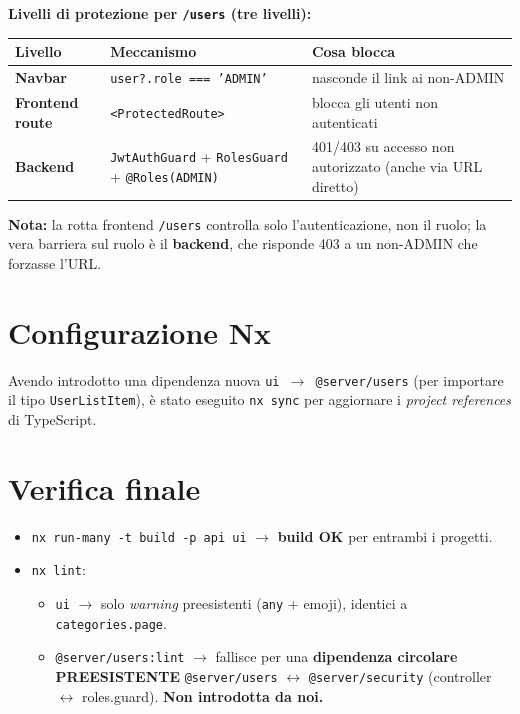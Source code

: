 \documentclass[11pt,a4paper]{article}
\newcommand{\code}[1]{\texttt{\small #1}}
\begin{document}
\textbf{Livelli di protezione per \code{/users} (tre livelli):}

\renewcommand{\arraystretch}{1.3}
\begin{tabularx}{\textwidth}{>{\bfseries}p{2.6cm} p{4.6cm} X}
\toprule
\normalfont Livello & \normalfont Meccanismo & \normalfont Cosa blocca \\
\midrule
Navbar & \code{user?.role === 'ADMIN'} & nasconde il link ai non-ADMIN \\
Frontend route & \code{<ProtectedRoute>} & blocca gli utenti non autenticati \\
Backend & \code{JwtAuthGuard} + \code{RolesGuard} + \code{@Roles(ADMIN)} & 401/403 su accesso non autorizzato (anche via URL diretto) \\
\bottomrule
\end{tabularx}
\renewcommand{\arraystretch}{1}

\medskip
\textbf{Nota:} la rotta frontend \code{/users} controlla solo l'autenticazione, non
il ruolo; la vera barriera sul ruolo è il \textbf{backend}, che risponde 403 a un
non-ADMIN che forzasse l'URL.

\section{Configurazione Nx}

Avendo introdotto una dipendenza nuova \code{ui $\rightarrow$ @server/users} (per
importare il tipo \code{UserListItem}), è stato eseguito \code{nx sync} per
aggiornare i \emph{project references} di TypeScript.

\section{Verifica finale}

\begin{itemize}[leftmargin=1.4em]
  \item \code{nx run-many -t build -p api ui} $\rightarrow$ \textbf{build OK} per
        entrambi i progetti.
  \item \code{nx lint}:
        \begin{itemize}[leftmargin=1.2em]
          \item \code{ui} $\rightarrow$ solo \emph{warning} preesistenti (\code{any}
                + emoji), identici a \code{categories.page}.
          \item \code{@server/\allowbreak users:lint} $\rightarrow$ fallisce per una
                \textbf{dipendenza circolare PREESISTENTE} \code{@server/users}
                $\leftrightarrow$ \code{@server/security} (controller $\leftrightarrow$
                roles.guard). \textbf{Non introdotta da noi.}
        \end{itemize}
\end{itemize}
\end{document}
